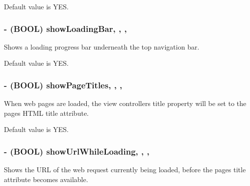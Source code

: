 Default value is Y\+E\+S. \hypertarget{interface_t_o_web_view_controller_a444c7f665ca6923c4cf38b00e95b8061}{}
\subsubsection[{show\+Loading\+Bar}]{\setlength{\rightskip}{0pt plus 5cm}-\/ (B\+O\+O\+L) show\+Loading\+Bar\hspace{0.3cm}{\ttfamily [read]}, {\ttfamily [write]}, {\ttfamily [nonatomic]}, {\ttfamily [assign]}}\label{interface_t_o_web_view_controller_a444c7f665ca6923c4cf38b00e95b8061}
Shows a loading progress bar underneath the top navigation bar.

Default value is Y\+E\+S. \hypertarget{interface_t_o_web_view_controller_a8456c37c8259cb9091ddeeaac3d29608}{}
\subsubsection[{show\+Page\+Titles}]{\setlength{\rightskip}{0pt plus 5cm}-\/ (B\+O\+O\+L) show\+Page\+Titles\hspace{0.3cm}{\ttfamily [read]}, {\ttfamily [write]}, {\ttfamily [nonatomic]}, {\ttfamily [assign]}}\label{interface_t_o_web_view_controller_a8456c37c8259cb9091ddeeaac3d29608}
When web pages are loaded, the view controller\textquotesingle{}s title property will be set to the page\textquotesingle{}s H\+T\+M\+L title attribute.

Default value is Y\+E\+S. \hypertarget{interface_t_o_web_view_controller_a3c6797f76219f17cbc29ee118c65e943}{}
\subsubsection[{show\+Url\+While\+Loading}]{\setlength{\rightskip}{0pt plus 5cm}-\/ (B\+O\+O\+L) show\+Url\+While\+Loading\hspace{0.3cm}{\ttfamily [read]}, {\ttfamily [write]}, {\ttfamily [nonatomic]}, {\ttfamily [assign]}}\label{interface_t_o_web_view_controller_a3c6797f76219f17cbc29ee118c65e943}
Shows the U\+R\+L of the web request currently being loaded, before the page\textquotesingle{}s title attribute becomes available.

